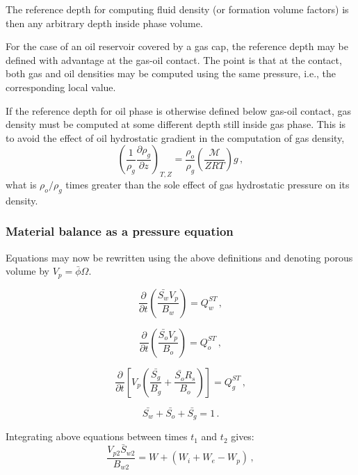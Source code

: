 \documentclass[authoryear,preprint,review,12pt]{elsarticle}
\begin{document}
The reference depth for computing fluid density (or formation volume factors) is then any arbitrary depth inside phase volume. 

For the case of an oil reservoir covered by a gas cap, the reference depth may be defined with advantage at the gas-oil contact. The point is that at the contact, both gas and oil densities may be computed using the same pressure, i.e., the corresponding local value. 

If the reference depth for oil phase is otherwise defined below gas-oil contact, gas density must be computed at some different depth still inside gas phase. This is to avoid the effect of oil hydrostatic gradient in the computation of gas density,
\begin{equation}
\left(\frac{1}{\rho_g}\frac{\partial \rho_g}{\partial z}\right)_{T,Z} = \frac{\rho_o}{\rho_g}\left(\frac{\mathcal{M}}{Z R T}\right)g  \, ,
\end{equation}
what is $\rho_o / \rho_g$ times greater than the sole effect of gas hydrostatic pressure on its density.

\subsubsection{Material balance as a pressure equation}

Equations may now be rewritten using the above definitions and denoting porous volume by $V_p = \bar{\phi}\Omega$.

\begin{equation}\label{eq: Sw4}
\frac{\partial}{\partial t} \left(\frac{\bar{S_w} V_p}{B_w} \right) = Q_w^{ST} \, ,
\end{equation}

\begin{equation}\label{eq: So4}
\frac{\partial}{\partial t} \left(\frac{\bar{S_o} V_p}{B_o} \right) = Q_o^{ST} \, ,
\end{equation}

\begin{equation}\label{eq: Sg4}
\frac{\partial}{\partial t} \left[ V_p \left(\frac{\bar{S_g}}{B_g} + \frac{\bar{S_o} R_s}{B_o} \right) \right] = Q_g^{ST} \, ,
\end{equation}

\begin{equation}\label{eq: S14}
\bar{S_w}+\bar{S_o}+\bar{S_g}=1 \, .
\end{equation}

Integrating above equations between times $t_1$ and $t_2$ gives:
\begin{equation}\label{eq: Sw5}
\frac{V_{p2} \bar{S}_{w2}}{B_{w2}}=W+\left(W_i+W_e-W_p\right) \, ,
\end{equation}
\end{document}
